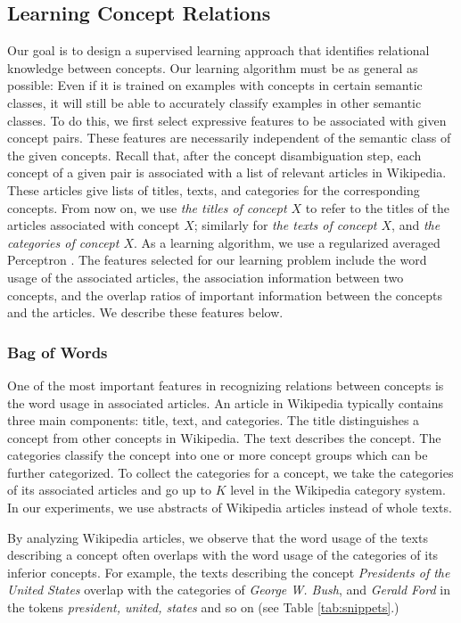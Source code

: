 \subsection{Learning Concept Relations}
\label{sec:learner}

Our goal is to design a supervised learning approach that identifies
relational knowledge between concepts. Our learning algorithm must be
as general as possible: Even if it is trained on examples with
concepts in certain semantic classes, it will still be able to
accurately classify examples in other semantic classes. To do this, we
first select expressive features to be associated with given
concept pairs. These features are necessarily independent of the
semantic class of the given concepts. Recall that, after the concept
disambiguation step, each concept of a given pair is associated with a
list of relevant articles in Wikipedia. These articles give lists of
titles, texts, and categories for the corresponding concepts. From now
on, we use {\em the titles of concept $X$} to refer to the titles of
the articles associated with concept $X$; similarly for {\em the texts
  of concept $X$}, and {\em the categories of concept $X$}. As
a learning algorithm, we use a regularized averaged Perceptron
\cite{FreundSc99}. The features selected for our learning problem
include the word usage of the associated articles, the association
information between two concepts, and the overlap ratios of important
information between the concepts and the articles. We describe these
features below.

\subsubsection{Bag of Words}

One of the most important features in recognizing relations between
concepts is the word usage in associated articles. An article in
Wikipedia typically contains three main components: title, text, and
categories. The title distinguishes a concept from other concepts in
Wikipedia. The text describes the concept. The categories classify the
concept into one or more concept groups which can be further
categorized. To collect the categories for a concept, we take the
categories of its associated articles and go up to $K$ level in the
Wikipedia category system. In our experiments, we use abstracts of
Wikipedia articles instead of whole texts.

By analyzing Wikipedia articles, we observe that the word usage
of the texts describing a concept often overlaps with the word usage
of the categories of its inferior concepts. For example, the texts
describing the concept \emph{Presidents of the United States} overlap
with the categories of \emph{George W. Bush}, and \emph{Gerald Ford}
in the tokens \emph{president, united, states} and so on (see Table
\ref{tab:snippets}.)

